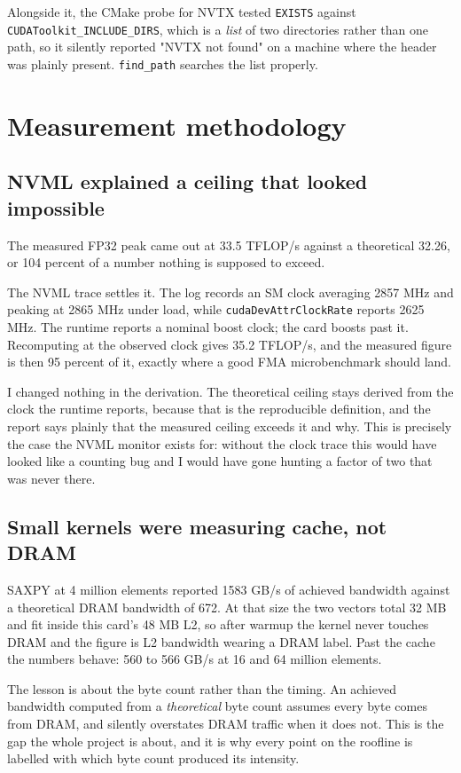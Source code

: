 ﻿\documentclass[11pt]{article}
\begin{document}
Alongside it, the CMake probe for NVTX tested \texttt{EXISTS} against
\texttt{CUDAToolkit\_INCLUDE\_DIRS}, which is a \emph{list} of two directories
rather than one path, so it silently reported "NVTX not found" on a machine where
the header was plainly present. \texttt{find\_path} searches the list properly.

\section{Measurement methodology}

\subsection{NVML explained a ceiling that looked impossible}

The measured FP32 peak came out at 33.5 TFLOP/s against a theoretical 32.26, or
104 percent of a number nothing is supposed to exceed.

The NVML trace settles it. The log records an SM clock averaging 2857 MHz and
peaking at 2865 MHz under load, while \texttt{cudaDevAttrClockRate} reports 2625
MHz. The runtime reports a nominal boost clock; the card boosts past it.
Recomputing at the observed clock gives 35.2 TFLOP/s, and the measured figure is
then 95 percent of it, exactly where a good FMA microbenchmark should land.

I changed nothing in the derivation. The theoretical ceiling stays derived from
the clock the runtime reports, because that is the reproducible definition, and
the report says plainly that the measured ceiling exceeds it and why. This is
precisely the case the NVML monitor exists for: without the clock trace this
would have looked like a counting bug and I would have gone hunting a factor of
two that was never there.

\subsection{Small kernels were measuring cache, not DRAM}

SAXPY at 4 million elements reported 1583 GB/s of achieved bandwidth against a
theoretical DRAM bandwidth of 672. At that size the two vectors total 32 MB and
fit inside this card's 48 MB L2, so after warmup the kernel never touches DRAM and
the figure is L2 bandwidth wearing a DRAM label. Past the cache the numbers
behave: 560 to 566 GB/s at 16 and 64 million elements.

The lesson is about the byte count rather than the timing. An achieved bandwidth
computed from a \emph{theoretical} byte count assumes every byte comes from DRAM,
and silently overstates DRAM traffic when it does not. This is the gap the whole
project is about, and it is why every point on the roofline is labelled with which
byte count produced its intensity.
\end{document}
